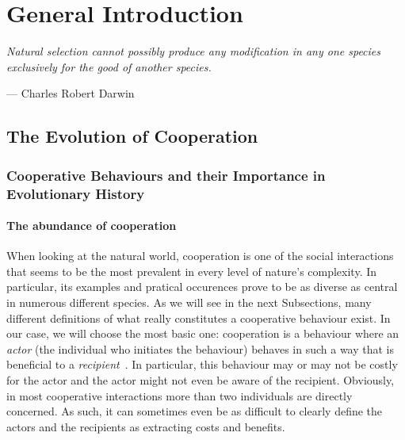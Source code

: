 \chapter{General Introduction}

\epigraph{\textit{Natural selection cannot possibly produce any modification in any one species exclusively for the good of another species.}}{--- \textup{Charles Robert Darwin}}

\minitoc[n] %


\section{The Evolution of Cooperation}

  \subsection{Cooperative Behaviours and their Importance in Evolutionary History}


    \subsubsection{The abundance of cooperation} When looking at the natural world, cooperation is one of the social interactions that seems to be the most prevalent in every level of nature's complexity. In particular, its examples and pratical occurences prove to be as diverse as central in numerous different species. As we will see in the next Subsections, many different definitions of what really constitutes a cooperative behaviour exist. In our case, we will choose the most basic one: cooperation is a behaviour where an \emph{actor} (the individual who initiates the behaviour) behaves in such a way that is beneficial to a \emph{recipient}~\parencite{West2007a}. In particular, this behaviour may or may not be costly for the actor and the actor might not even be aware of the recipient. Obviously, in most cooperative interactions more than two individuals are directly concerned. As such, it can sometimes even be as difficult to clearly define the actors and the recipients as extracting costs and benefits.


